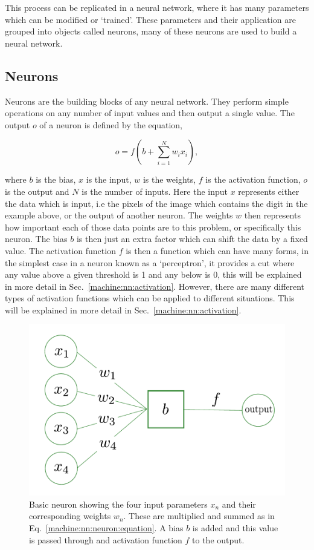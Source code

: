 This process can be replicated in a neural network, where it has many parameters which can be modified or `trained'. 
These parameters and their application are grouped into objects called neurons, many of these neurons are used to build a neural network.

\subsection{\label{machine:nn:neuron}Neurons}

Neurons are the building blocks of any neural network.
They perform simple operations on any number of input values and then output a single value.
The output $o$ of a neuron is defined by the equation,

\begin{equation}
    o = f\left(b + \sum_{i=1}^{N} w_i x_i  \right),
    \label{machine:nn:neuron:equation}
\end{equation}

where $b$ is the bias, $x$ is the input, $w$ is the weights, $f$ is the activation function, $o$ is the output and $N$ is the number of inputs.
Here the input $x$ represents either the data which is input, i.e the pixels of the image which contains the digit in the example above, or the output of another neuron.
The weights $w$ then represents how important each of those data points are to this problem, or specifically this neuron. 
The bias $b$ is then just an extra factor which can shift the data by a fixed value.
The activation function $f$ is then a function which can have many forms, in the simplest case in a neuron known as a `perceptron', it provides a cut where any value above a given threshold is 1 and any below is 0, this will be explained in more detail in Sec.~\ref{machine:nn:activation}. 
However, there are many different types of activation functions which can be applied to different situations.
This will be explained in more detail in Sec.~\ref{machine:nn:activation}.

\begin{figure}[h]
    \centering
    \includegraphics[width=0.6\columnwidth]{C4_cnn/neuron.pdf}
    \caption[Basic neuron]{Basic neuron showing the four input parameters $x_n$ and their corresponding weights $w_n$. These are multiplied and summed as in Eq.~\ref{machine:nn:neuron:equation}. A bias $b$ is added and this value is passed through and activation function $f$ to the output.}
    \label{machine:nn:neuron:plot}
\end{figure}

